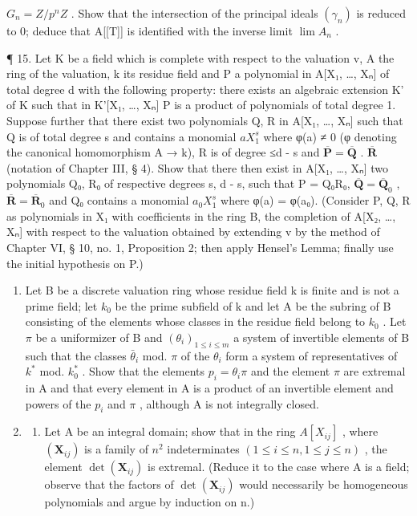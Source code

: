 \(G_{n} = Z/p^{n}Z\) . Show that the intersection of the principal ideals \((\gamma_{n})\) is reduced to 0; deduce that A{[}{[}T{]}{]} is identified with the inverse limit \(\lim A_{n}\) .

¶ 15. Let K be a field which is complete with respect to the valuation v, A the ring of the valuation, k its residue field and P a polynomial in A{[}X₁, \ldots, Xₙ{]} of total degree d with the following property: there exists an algebraic extension K' of K such that in K'{[}X₁, \ldots, Xₙ{]} P is a product of polynomials of total degree 1. Suppose further that there exist two polynomials Q, R in A{[}X₁, \ldots, Xₙ{]} such that Q is of total degree s and contains a monomial \(aX_1^{s}\) where φ(a) ≠ 0 (φ denoting the canonical homomorphism A → k), R is of degree ≤d - s and \(\overline{\mathbf{P}} = \overline{\mathbf{Q}}\) . \(\overline{\mathbf{R}}\) (notation of Chapter III, § 4). Show that there then exist in A{[}X₁, \ldots, Xₙ{]} two polynomials Q₀, R₀ of respective degrees s, d - s, such that P = Q₀R₀, \(\overline{\mathbf{Q}} = \overline{\mathbf{Q}}_0\) , \(\overline{\mathbf{R}} = \overline{\mathbf{R}}_0\) and Q₀ contains a monomial \(a_0X_1^{s}\) where φ(a) = φ(a₀). (Consider P, Q, R as polynomials in X₁ with coefficients in the ring B, the completion of A{[}X₂, \ldots, Xₙ{]} with respect to the valuation obtained by extending v by the method of Chapter VI, § 10, no. 1, Proposition 2; then apply Hensel's Lemma; finally use the initial hypothesis on P.)

\begin{enumerate}
\def\labelenumi{\arabic{enumi}.}
\setcounter{enumi}{15}
\item
  Let B be a discrete valuation ring whose residue field k is finite and is not a prime field; let \(k_{0}\) be the prime subfield of k and let A be the subring of B consisting of the elements whose classes in the residue field belong to \(k_{0}\) . Let \(\pi\) be a uniformizer of B and \((\theta_{i})_{1\leq i\leq m}\) a system of invertible elements of B such that the classes \(\bar{\theta}_{i}\) mod. \(\pi\) of the \(\theta_{i}\) form a system of representatives of \(k^{*}\) mod. \(k_{0}^{*}\) . Show that the elements \(p_{i}=\theta_{i}\pi\) and the element \(\pi\) are extremal in A and that every element in A is a product of an invertible element and powers of the \(p_{i}\) and \(\pi\) , although A is not integrally closed.
\item
  \begin{enumerate}
  \def\labelenumii{(\alph{enumii})}
  \tightlist
  \item
    Let A be an integral domain; show that in the ring \(A[X_{ij}]\) , where \((\mathbf{X}_{ij})\) is a family of \(n^{2}\) indeterminates \((1 \leqslant i \leqslant n, 1 \leqslant j \leqslant n)\) , the element \(\det(\mathbf{X}_{ij})\) is extremal. (Reduce it to the case where A is a field; observe that the factors of \(\det(\mathbf{X}_{ij})\) would necessarily be homogeneous polynomials and argue by induction on n.)
  \end{enumerate}
\end{enumerate}

